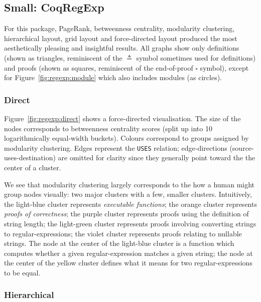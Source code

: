 \subsection{Small: CoqRegExp}

For this package, PageRank, betweenness centrality, modularity clustering,
hierarchical layout, grid layout and force-directed layout produced the most
aesthetically pleasing and insightful results. All graphs show only definitions
(shown as triangles, reminiscent of the $\triangleq$ symbol sometimes used for
definitions) and proofs (shown as squares, reminiscent of the end-of-proof
$\square$ symbol), except for Figure~\ref{fig:regexp:module} which also includes
modules (as circles).

\subsubsection{Direct}

Figure~\ref{fig:regexp:direct} shows a force-directed visualisation. The size of
the nodes corresponds to betweenness centrality scores (split up into 10
logarithmically equal-width buckets). Colours correspond to groups assigned by modularity
clustering. Edges represent the \texttt{USES} relation; edge-directions
(source-uses-destination) are omitted for clarity since they generally point
toward the the center of a cluster.

We see that modularity clustering largely corresponds to the how a human might
group nodes visually: two major clusters with a few, smaller clusters.
Intuitively, the \textcolor{graphblue}{light-blue} cluster represents
\textcolor{graphblue}{\emph{executable functions}}; the
\textcolor{graphorange}{orange} cluster represents
\textcolor{graphorange}{\emph{proofs of correctness}}; the
\textcolor{graphpurple}{purple} cluster represents proofs using the definition
of \textcolor{graphpurple}{string length}; the
\textcolor{graphgreen}{light-green} cluster represents proofs involving
\textcolor{graphgreen}{converting strings to regular-expressions}; the
\textcolor{graphviolet}{violet} cluster represents proofs relating to
\textcolor{graphviolet}{nullable strings}. The node at the center of the light-blue
cluster is a function which computes whether a given regular-expression matches
a given string; the node at the center of the yellow cluster defines what it
means for two regular-expressions to be equal.

\subsubsection{Hierarchical}

